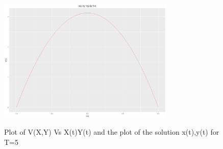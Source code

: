\documentclass[twoside,12pt]{article}
\begin{document}
{\begin{figure}[htbp!]
\begin{center}
{                       \includegraphics[width=0.75\textwidth]{proj_1_g_xy_t_5}
                    }\\ %
    \end{center}
    \caption{%
     Plot of V(X,Y) Vs X(t)Y(t) and the plot of the solution x(t),y(t) for T=5
     }%
   \label{fig:proj_1_g_t_5}
\end{figure}
}

\FloatBarrier
\end{document}
